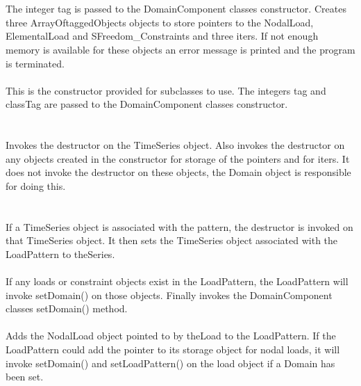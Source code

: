  \\ 
\\ 
The integer \p tag is passed to the DomainComponent classes
constructor. Creates three ArrayOftaggedObjects objects to store
pointers to the NodalLoad, ElementalLoad and SFreedom\_Constraints and three
iters. If not enough memory is available for these objects an error
message is printed and the program is terminated. \\  

\\ 
This is the constructor provided for subclasses to use. The integers
\p tag and \p classTag are passed to the DomainComponent classes
constructor. \\ 

 \\
\\ 
Invokes the destructor on the TimeSeries object. Also invokes the
destructor on any objects created in the constructor for storage of
the pointers and for iters. It does not invoke the destructor on these
objects, the Domain object is responsible for doing this.\\

 \\
\\
If a TimeSeries object is associated with the pattern, the destructor
is invoked on that TimeSeries object. It then sets the TimeSeries object
associated with the LoadPattern to \p theSeries. \\

\\ 
If any loads or constraint objects exist in the LoadPattern, the
LoadPattern will invoke setDomain() on those objects. Finally
invokes the DomainComponent classes setDomain() method. \\

\\
Adds the NodalLoad object pointed to by \p theLoad to the
LoadPattern. If the LoadPattern could add the pointer to its storage
object for nodal loads, it will invoke setDomain()
and setLoadPattern() on the load object if a Domain has been set. \\

